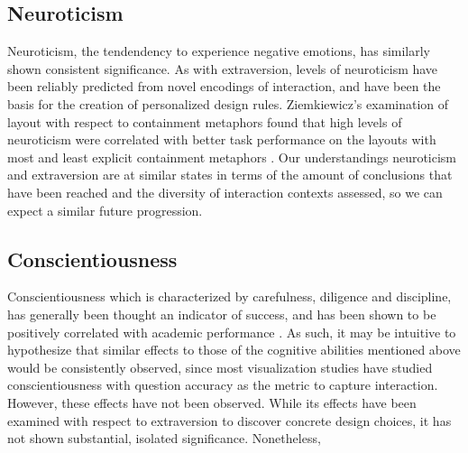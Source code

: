 \documentclass[conference]{IEEEtran}
\begin{document}
\subsection{Neuroticism}\label{Neuroticism}
Neuroticism, the tendendency to experience negative emotions, has similarly shown consistent
significance. As with extraversion, levels of neuroticism have been reliably predicted from
novel encodings of interaction\cite{Waldo}, and have been the basis for the creation of
personalized design rules\cite{SarsamFirstLook}. Ziemkiewicz's examination of layout with
respect to containment metaphors found that high levels of neuroticism were correlated with
better task performance on the layouts with most and least explicit containment metaphors
\cite{Ziemkiewicz}. Our understandings neuroticism and extraversion are at similar states
in terms of the amount of conclusions that have been reached and the diversity of interaction
contexts assessed, so we can expect a similar future progression.

\subsection{Conscientiousness}\label{Conscientiousness}
Conscientiousness which is characterized by carefulness, diligence and discipline, has generally
been thought an indicator of success, and has been shown to be positively correlated with
academic performance \cite{ImhofSpaet2013pv}. As such, it may be intuitive to hypothesize
that similar effects to those of the cognitive abilities mentioned above would be consistently
observed, since most visualization studies have studied conscientiousness with question
accuracy as the metric to capture interaction. However, these effects have not been observed.
While its effects have been examined with respect to extraversion \cite{SarsamFirstLook} to
discover concrete design choices, it has not shown substantial, isolated significance.
Nonetheless,  
\end{document}
